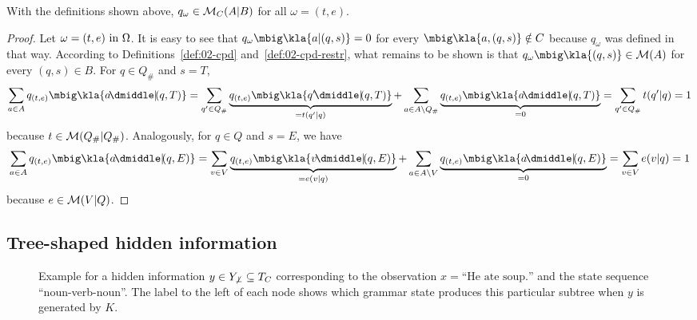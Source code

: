 \begin{lemma}
 With the definitions shown above, $q_\omega\in\mathcal M_C(A|B)$ for all $\omega=(t,e)$.
\end{lemma}

\begin{proof}
 Let $\omega=(t,e)\text{ in }\Omega$. It is easy to see that
 $q_\omega\mbig\kla{a|(q,s)} = 0$ for every $\mbig\kla{a,(q,s)}\notin C$
 because $q_\omega$ was defined in that way. According to
 Definitions~\ref{def:02-cpd} and~\ref{def:02-cpd-restr}, what remains to be
 shown is that $q_\omega\mbig\kla{(q,s)}\in\um(A)$ for every $(q,s)\in B$. For
 $q\in Q_\#$ and $s = T$,
 \[
  \sum_{a\in A} q_{(t,e)}\mbig\kla{a\npipe(q,T)}
  = \sum_{q'\in Q_\#} \underbrace{q_{(t,e)}\mbig\kla{q'\npipe(q,T)}}_{=t(q'|q)}
  + \sum_{a\in A\setminus Q_\#} \underbrace{q_{(t,e)}\mbig\kla{a\npipe(q,T)}}_{=0}
  = \sum_{q'\in Q_\#} t(q'|q) = 1
 \]
 because $t\in\mathcal M(Q_\#|Q_\#)$. Analogously, for $q\in Q$ and $s = E$, we have
 \[
  \sum_{a\in A} q_{(t,e)}\mbig\kla{a\npipe(q,E)}
  = \sum_{v\in V} \underbrace{q_{(t,e)}\mbig\kla{v\npipe(q,E)}}_{=e(v|q)}
  + \sum_{a\in A\setminus V} \underbrace{q_{(t,e)}\mbig\kla{a\npipe(q,E)}}_{=0}
  = \sum_{v\in V} e(v|q) = 1
 \]
 because $e\in\mathcal M(V|Q)$.
\end{proof}

\subsection{Tree-shaped hidden information}

\begin{figure}[t!]
 \centering
 \caption{
  Example for a hidden information $y\in Y_{\not\bot}\subseteq T_C$
  corresponding to the observation $x = \text{``He ate soup.''}$ and the state
  sequence ``noun-verb-noun''. The label to the left of each node shows which
  grammar state produces this particular subtree when $y$ is generated by $K$.
 \label{fig:03-example-y}}
\end{figure}

